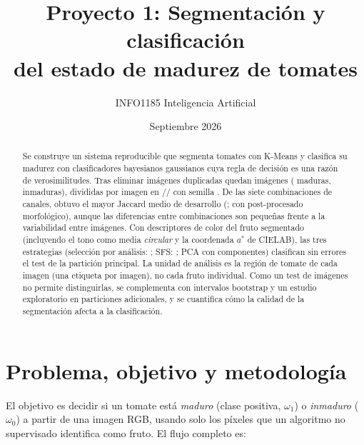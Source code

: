 \documentclass[11pt,a4paper]{article}
\title{\textbf{Proyecto 1: Segmentación y clasificación\\del estado de madurez de tomates}}
\author{\AuthorLine INFO1185 Inteligencia Artificial}
\date{Septiembre 2026}
\begin{document}
\maketitle

\begin{abstract}
Se construye un sistema reproducible que segmenta tomates con K-Means y clasifica su
madurez con clasificadores bayesianos gaussianos cuya regla de decisión es una razón de
verosimilitudes. Tras eliminar \NDuplicates{} imágenes duplicadas quedan \NImages{}
imágenes (\NRipe{} maduras, \NUnripe{} inmaduras), divididas por imagen en
\NTrain/\NVal/\NTest{} con semilla \Seed. De las siete combinaciones de canales, \BestCombo{}
obtuvo el mayor Jaccard medio de desarrollo (\BestDevJ; \BestDevPostJ{} con post-procesado
morfológico), aunque las diferencias entre combinaciones son pequeñas frente a la
variabilidad entre imágenes. Con descriptores de color del fruto segmentado (incluyendo el
tono como media \emph{circular} y la coordenada $a^*$ de CIELAB), las tres estrategias
(selección por análisis: \AnalysisFeatures; SFS: \SFSFeatures; PCA con \PCAn{} componentes)
clasifican sin errores el test de la partición principal. La unidad de análisis es la región de tomate de cada imagen (una etiqueta por imagen), no cada fruto individual. Como un test de \NTest{} imágenes no
permite distinguirlas, se complementa con intervalos bootstrap y un estudio exploratorio en \NRepeats{} particiones
adicionales, y se cuantifica cómo la calidad de la segmentación afecta a la clasificación.
\end{abstract}

\tableofcontents
\newpage

\section{Problema, objetivo y metodología}

El objetivo es decidir si un tomate está \emph{maduro} (clase positiva, $\omega_1$) o
\emph{inmaduro} ($\omega_0$) a partir de una imagen RGB, usando solo los píxeles que un
algoritmo no supervisado identifica como fruto. El flujo completo es:

\begin{center}
\end{center}
\end{document}
